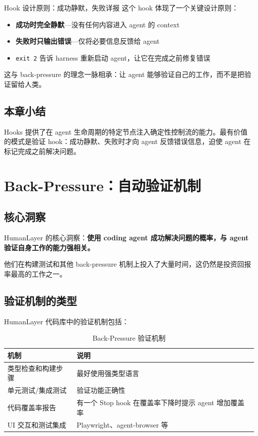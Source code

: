\documentclass[a4paper]{article}
\begin{document}
\begin{importantbox}{Hook 设计原则：成功静默，失败详报}
这个 hook 体现了一个关键设计原则：
\begin{itemize}[leftmargin=1.5em]
    \item \textbf{成功时完全静默}---没有任何内容进入 agent 的 context
    \item \textbf{失败时只输出错误}---仅将必要信息反馈给 agent
    \item \texttt{exit 2} 告诉 harness 重新启动 agent，让它在完成之前修复错误
\end{itemize}
这与 back-pressure 的理念一脉相承：让 agent 能够验证自己的工作，而不是把验证留给人类。
\end{importantbox}

\subsection{本章小结}

Hooks 提供了在 agent 生命周期的特定节点注入确定性控制流的能力。最有价值的模式是验证 hook：成功静默、失败时才向 agent 反馈错误信息，迫使 agent 在标记完成之前解决问题。


\section{Back-Pressure：自动验证机制}

\subsection{核心洞察}

HumanLayer 的核心洞察：\textbf{使用 coding agent 成功解决问题的概率，与 agent 验证自身工作的能力强相关。}

他们在构建测试和其他 back-pressure 机制上投入了大量时间，这仍然是投资回报率最高的工作之一。

\subsection{验证机制的类型}

HumanLayer 代码库中的验证机制包括：

\begin{table}[H]
\centering
\caption{Back-Pressure 验证机制}
\begin{tabular}{@{}p{4cm}p{9cm}@{}}
\toprule
\textbf{机制} & \textbf{说明} \\
\midrule
类型检查和构建步骤 & 最好使用强类型语言 \\
单元测试/集成测试 & 验证功能正确性 \\
代码覆盖率报告 & 有一个 Stop hook 在覆盖率下降时提示 agent 增加覆盖率 \\
UI 交互和测试集成 & Playwright、agent-browser 等 \\
\bottomrule
\end{tabular}
\end{table}
\end{document}
